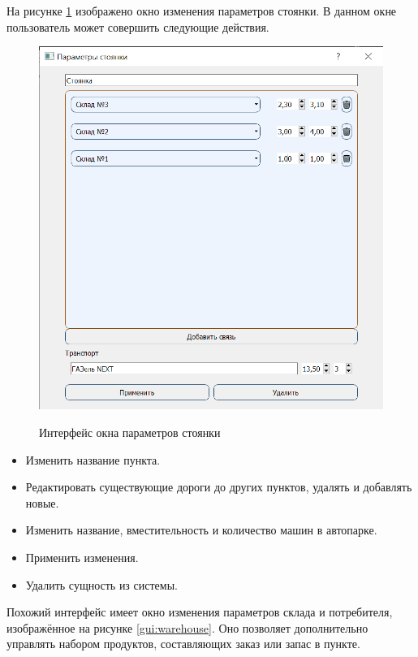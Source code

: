 \qquad
На рисунке \ref{gui:parking} изображено окно изменения параметров стоянки. В данном окне пользователь может совершить следующие действия.

\begin{figure}[hp]
	\begin{center}
		{\includegraphics[scale=0.8, angle=0, page=1]{img/parking_page.png}}
		\caption{Интерфейс окна параметров стоянки}
		\label{gui:parking}
	\end{center}
\end{figure}

\begin{itemize}
	\item Изменить название пункта.
	\item Редактировать существующие дороги до других пунктов, удалять и добавлять новые.
	\item Изменить название, вместительность и количество машин в автопарке.
	\item Применить изменения.
	\item Удалить сущность из системы.
\end{itemize}

Похожий интерфейс имеет окно изменения параметров склада и потребителя, изображённое на рисунке \ref{gui:warehouse}. Оно позволяет дополнительно управлять набором продуктов, составляющих заказ или запас в пункте.

